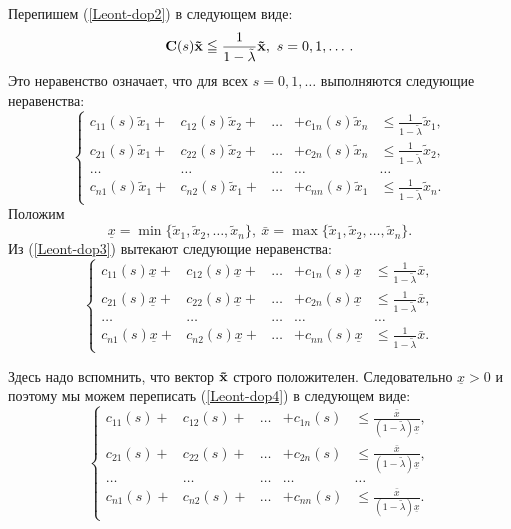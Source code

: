     Перепишем (\ref{Leont-dop2}) в следующем виде:
    \[\vc{C}(s)\vc{\tilde{x}}
    \leqq\frac{1}{1-\tilde{\lambda}}\vc{\tilde{x}}, \ s=0,1,\ldots\,.\]
    Это неравенство означает, что для всех $s=0,1,\ldots$ выполняются следующие
    неравенства:
\begin{equation} \label{Leont-dop3}
    \left\{
\begin{array}{ccccc}
   c_{11}(s)\tilde{x}_{1} +& c_{12}(s)\tilde{x}_{2} +& \ldots & +c_{1n}(s)\tilde{x}_{n}
   & \leq \frac{1}{1-\tilde{\lambda}}\tilde{x}_{1}, \\
   c_{21}(s)\tilde{x}_{1} +& c_{22}(s)\tilde{x}_{2} +& \ldots & +c_{2n}(s)\tilde{x}_{n}
   & \leq \frac{1}{1-\tilde{\lambda}}\tilde{x}_{2},\\
   \ldots& \ldots &\ldots &\ldots &\ldots \\
   c_{n1}(s)\tilde{x}_{1}  +& c_{n2}(s)\tilde{x}_{1}  +& \ldots & +c_{nn}(s)\tilde{x}_{1}
   & \leq \frac{1}{1-\tilde{\lambda}}\tilde{x}_{n}.
\end{array}
\right.
\end{equation}
    Положим
    \[\underline{x}=\min\{\tilde{x}_{1}, \tilde{x}_{2},\ldots,
    \tilde{x}_{n}\}, \
    \bar{x}=\max\{\tilde{x}_{1}, \tilde{x}_{2},\ldots, \tilde{x}_{n}\}.\]
    Из (\ref{Leont-dop3}) вытекают следующие неравенства:
    \begin{equation} \label{Leont-dop4}
    \left\{
\begin{array}{ccccc}
   c_{11}(s)\underline{x} +& c_{12}(s)\underline{x} +& \ldots & +c_{1n}(s)\underline{x}
   & \leq \frac{1}{1-\tilde{\lambda}}\bar{x}, \\
   c_{21}(s)\underline{x} +& c_{22}(s)\underline{x} +& \ldots & +c_{2n}(s)\underline{x}
   & \leq \frac{1}{1-\tilde{\lambda}}\bar{x},\\
   \ldots& \ldots &\ldots &\ldots &\ldots \\
   c_{n1}(s)\underline{x}  +& c_{n2}(s)\underline{x} +& \ldots & +c_{nn}(s)\underline{x}
   & \leq \frac{1}{1-\tilde{\lambda}}\bar{x}.
\end{array}
\right.
\end{equation}

    Здесь надо вспомнить, что вектор
    $\mathbf{\tilde{x}}$ строго положителен. Следовательно
    $\underline{x}>0$ и поэтому мы можем переписать
    (\ref{Leont-dop4}) в следующем виде:
    \[\left\{
\begin{array}{ccccc}
   c_{11}(s) +& c_{12}(s) +& \ldots & +c_{1n}(s)
   & \leq \frac{\bar{x}}{(1-\tilde{\lambda})\underline{x}}, \\
   c_{21}(s) +& c_{22}(s) +& \ldots & +c_{2n}(s)
   & \leq \frac{\bar{x}}{(1-\tilde{\lambda})\underline{x}},\\
   \ldots& \ldots &\ldots &\ldots &\ldots \\
   c_{n1}(s) +& c_{n2}(s) +& \ldots & +c_{nn}(s)
   & \leq \frac{\bar{x}}{(1-\tilde{\lambda})\underline{x}}.
\end{array}
\right.\]

